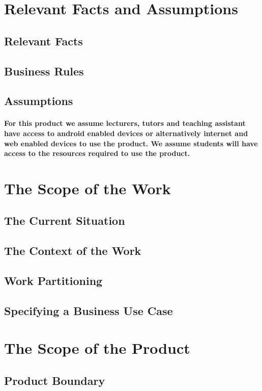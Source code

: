 \documentclass[12pt,a4paper]{article}
\begin{document}
\section{Relevant Facts and Assumptions}
\subsection{Relevant Facts}
\subsection{Business Rules}
\subsection{Assumptions}
\paragraph{For this product we assume lecturers, tutors and teaching assistant have access to android enabled devices or alternatively internet and web enabled devices to use the product.
We assume students will have access to the resources required to use the product.
}
\pagebreak
\section{The Scope of the Work}
\subsection{The Current Situation}
\subsection{The Context of the Work}
\subsection{Work Partitioning}
\subsection{Specifying a Business Use Case}
\pagebreak
\section{The Scope of the Product}
\subsection{Product Boundary}
\end{document}

